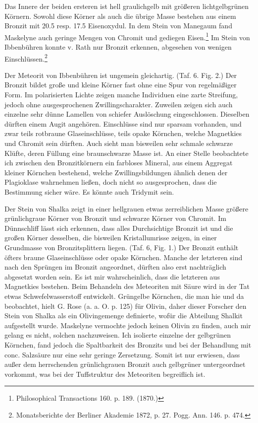 \documentclass[a4paper, 12pt, oneside]{article}
\begin{document}
Das Innere der beiden ersteren ist hell graulichgelb mit größeren lichtgelbgrünen Körnern. Sowohl diese Körner als auch die übrige Masse bestehen aus einem Bronzit mit 20.5 resp. 17.5 Eisenoxydul. In dem Stein von Manegaum fand Maskelyne auch geringe Mengen von Chromit und gediegen Eisen.\footnote{Philosophical Transactions 160. p. 189. (1870.)} Im Stein von Ibbenbühren konnte v. Rath nur Bronzit erkennen, abgesehen von wenigen Einschlüssen.\footnote{Monatsberichte der Berliner Akademie 1872, p. 27. Pogg. Ann. 146. p. 474.}

Der Meteorit von Ibbenbühren ist ungemein gleichartig. (Taf. 6. Fig. 2.) Der Bronzit bildet große und kleine Körner fast ohne eine Spur von regelmäßiger Form. Im polarisierten Lichte zeigen manche Individuen eine zarte Streifung, jedoch ohne ausgesprochenen Zwillingscharakter. Zuweilen zeigen sich auch einzelne sehr dünne Lamellen von schiefer Auslöschung eingeschlossen. Dieselben dürften einem Augit angehören. Einschlüsse sind nur sparsam vorhanden, und zwar teils rotbraune Glaseinschlüsse, teils opake Körnchen, welche Magnetkies und Chromit sein dürften. Auch sieht man bisweilen sehr schmale schwarze Klüfte, deren Füllung eine braunschwarze Masse ist. An einer Stelle beobachtete ich zwischen den Bronzitkörnern ein farbloses Mineral, aus einem Aggregat kleiner Körnchen bestehend, welche Zwillingsbildungen ähnlich denen der Plagioklase wahrnehmen ließen, doch nicht so ausgesprochen, dass die Bestimmung sicher wäre. Es könnte auch Tridymit sein.

Der Stein von Shalka zeigt in einer hellgrauen etwas zerreiblichen Masse größere grünlichgraue Körner von Bronzit und schwarze Körner von Chromit. Im Dünnschliff lässt sich erkennen, dass alles Durchsichtige Bronzit ist und die großen Körner desselben, die bisweilen Kristallumrisse zeigen, in einer Grundmasse von Bronzitsplittern liegen. (Taf. 6, Fig. 1.) Der Bronzit enthält öfters braune Glaseinschlüsse oder opake Körnchen. Manche der letzteren sind nach den Sprüngen im Bronzit angeordnet, dürften also erst nachträglich abgesetzt worden sein. Es ist mir wahrscheinlich, dass die letzteren aus Magnetkies bestehen. Beim Behandeln des Meteoriten mit Säure wird in der Tat etwas Schwefelwasserstoff entwickelt. Grüngelbe Körnchen, die man hie und da beobachtet, hielt G. Rose (a. a. O. p. 125) für Olivin, daher dieser Forscher den Stein von Shalka als ein Olivingemenge definierte, wofür die Abteilung Shalkit aufgestellt wurde. Maskelyne vermochte jedoch keinen Olivin zu finden, auch mir gelang es nicht, solchen nachzuweisen. Ich isolierte einzelne der gelbgrünen Körnchen, fand jedoch die Spaltbarkeit des Bronzits und bei der Behandlung mit conc. Salzsäure nur eine sehr geringe Zersetzung. Somit ist nur erwiesen, dass außer dem herrschenden grünlichgrauen Bronzit auch gelbgrüner untergeordnet vorkommt, was bei der Tuffstruktur des Meteoriten begreiflich ist.
\end{document}
